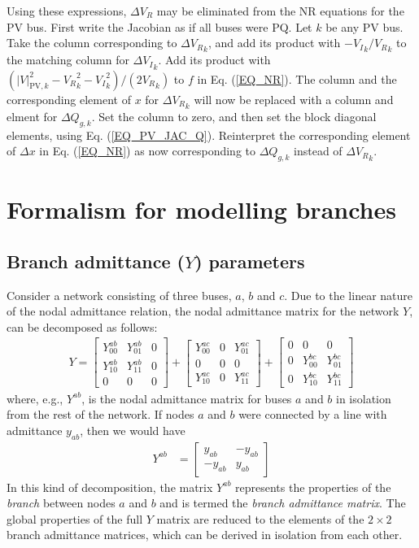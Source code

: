 \documentclass[10pt]{article}
\newcommand{\Vr}{{V_R}}
\newcommand{\Vi}{{V_I}}
\begin{document}
Using these expressions, $\Delta \Vr$ may be eliminated from the NR equations for the PV bus. First write the Jacobian as if all buses were PQ. Let $k$ be any PV bus. Take the column corresponding to $\Delta \Vr_k$, and add its product with $-\Vi_k/\Vr_k$ to the matching column for  $\Delta \Vi_k$. Add its product with $(|V|^2_{\text{PV},k} - \Vr_k^2 - \Vi_k^2)/(2\Vr_k)$ to $f$ in Eq. (\ref{EQ_NR}). The column and the corresponding element of $x$ for $\Delta \Vr_k$ will now be replaced with a column and elment for $\Delta Q_{g,k}$. Set the column to zero, and then set the block diagonal elements, using Eq. (\ref{EQ_PV_JAC_Q}). Reinterpret the corresponding element of $\Delta x$ in Eq. (\ref{EQ_NR}) as now corresponding to $\Delta Q_{g,k}$ instead of $\Delta \Vr_k$.

\section{Formalism for modelling branches}
\subsection{Branch admittance ($Y$) parameters}
Consider a network consisting of three buses, $a$, $b$ and $c$. Due to the linear nature of the nodal admittance relation, the nodal admittance matrix for the network $Y$, can be decomposed as follows:
\begin{align}
	Y = \begin{bmatrix}
		Y^{ab}_{00} & Y^{ab}_{01} & 0 \\ Y^{ab}_{10} & Y^{ab}_{11} & 0 \\ 0 & 0 & 0
	\end{bmatrix} + \begin{bmatrix}
		Y^{ac}_{00} & 0 & Y^{ac}_{01} \\ 0 & 0 & 0 \\ Y^{ac}_{10} & 0 &  Y^{ac}_{11}
	\end{bmatrix} + \begin{bmatrix}
		0 & 0 & 0 \\ 0 & Y^{bc}_{00} & Y^{bc}_{01} \\ 0 & Y^{bc}_{10} &  Y^{bc}_{11}
	\end{bmatrix}
	\label{EQ_BRANCH_DECOMP}
\end{align}
where, e.g., $Y^{ab}$, is the nodal admittance matrix for buses $a$ and $b$ in isolation from the rest of the network. If nodes $a$ and $b$ were connected by a line with admittance $y_{ab}$, then we would have
\begin{align}
	Y^{ab} &= 
	\begin{bmatrix}
		y_{ab} & -y_{ab} \\
		-y_{ab} & y_{ab}
	\end{bmatrix}
\end{align}
In this kind of decomposition, the matrix $Y^{ab}$ represents the properties of the \emph{branch} between nodes $a$ and $b$ and is termed the \emph{branch admittance matrix}. The global properties of the full $Y$ matrix are reduced to the elements of the $2 \times 2$ branch admittance matrices, which can be derived in isolation from each other.
\end{document}
